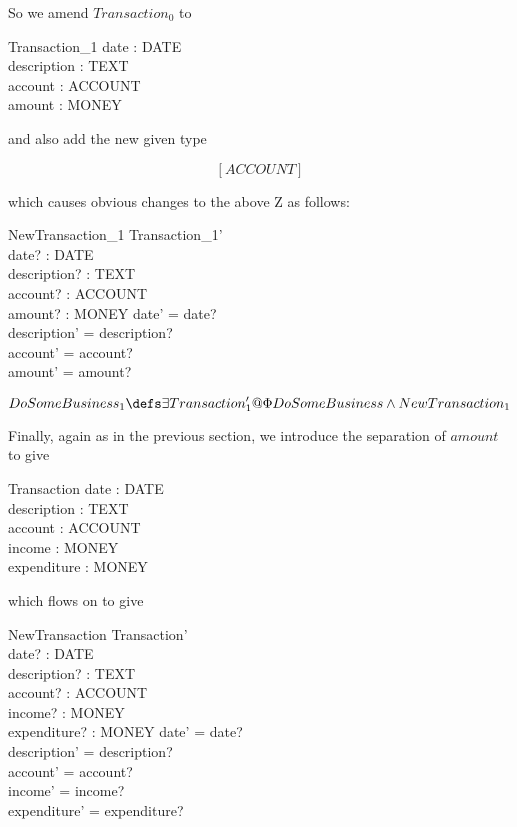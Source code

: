 \documentclass[11pt]{amsart}
\begin{document}
So we amend $Transaction_0$  to

\begin{schema}{Transaction_1}
date : DATE\\
description : TEXT\\
account : ACCOUNT\\
amount : MONEY
\end{schema}

and also add the new given type

\[
[ACCOUNT]
\]

which causes obvious changes to the above Z as follows:

\begin{schema}{NewTransaction_1}
Transaction_1'\\
date? : DATE\\
description? : TEXT\\
account? : ACCOUNT\\ 
amount? : MONEY
\where
date' = date?\\
description' = description?\\
account' = account?\\
amount' = amount?
\end{schema}

\[
DoSomeBusiness_1 \defs \exists Transaction_1' @ \Phi DoSomeBusiness \land New Transaction_1
\]

Finally, again as in the previous section, we introduce the separation of $amount$ to give

\begin{schema}{Transaction}
date : DATE\\
description : TEXT\\
account : ACCOUNT\\
income : MONEY\\
expenditure : MONEY
\end{schema}

which flows on to give

\begin{schema}{NewTransaction}
Transaction'\\
date? : DATE\\
description? : TEXT\\
account? : ACCOUNT\\ 
income? : MONEY\\
expenditure? : MONEY
\where
date' = date?\\
description' = description?\\
account' = account?\\
income' = income?\\
expenditure' = expenditure?
\end{schema}
\end{document}
